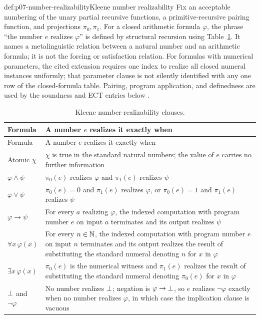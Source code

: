 \begin{hbdefinition}{def:p07-number-realizability}{Kleene number realizability}
Fix an acceptable numbering of the unary partial recursive functions, a
primitive-recursive pairing function, and projections \(\pi_0,\pi_1\).  For
a closed arithmetic formula \(\varphi\), the phrase
``the number \(e\) realizes \(\varphi\)'' is defined by structural recursion using
Table~\ref{tab:p07-number-realizability}.  It names a metalinguistic relation
between a natural number and an arithmetic formula; it is not the forcing or
satisfaction relation.  For formulas with numerical parameters, the cited
extension requires one index to realize all closed numeral instances
uniformly; that parameter clause is not silently identified with any one row
of the closed-formula table.  Pairing, program application, and definedness
are used by the soundness and ECT entries below \cite{Troelstra1998}.
\end{hbdefinition}

\begingroup\small
\begin{longtable}{@{}p{}p{}@{}}
\caption{Kleene number-realizability clauses.}
\label{tab:p07-number-realizability}\\
\toprule
Formula & A number \(e\) realizes it exactly when \\
\midrule
\endfirsthead
\toprule
Formula & A number \(e\) realizes it exactly when \\
\midrule
\endhead
Atomic \(\chi\) & \(\chi\) is true in the standard natural numbers; the value of
\(e\) carries no further information \\
\(\varphi\land\psi\) & \(\pi_0(e)\) realizes \(\varphi\) and
\(\pi_1(e)\) realizes \(\psi\) \\
\(\varphi\lor\psi\) & \(\pi_0(e)=0\) and \(\pi_1(e)\) realizes \(\varphi\), or
\(\pi_0(e)=1\) and \(\pi_1(e)\) realizes \(\psi\) \\
\(\varphi\to\psi\) & For every \(a\) realizing \(\varphi\), the indexed
computation with program number \(e\) on input \(a\) terminates and its output
realizes \(\psi\) \\
\(\forall x\,\varphi(x)\) & For every \(n\in\mathbb{N}\), the indexed computation
with program number \(e\) on input \(n\) terminates and its output realizes the
result of substituting the standard numeral denoting \(n\) for \(x\) in
\(\varphi\) \\
\(\exists x\,\varphi(x)\) & \(\pi_0(e)\) is the numerical witness and
\(\pi_1(e)\) realizes the result of substituting the standard numeral denoting
\(\pi_0(e)\) for \(x\) in \(\varphi\) \\
\(\bot\) and \(\neg\varphi\) & No number realizes \(\bot\); negation is
\(\varphi\to\bot\), so \(e\) realizes \(\neg\varphi\) exactly when no
number realizes \(\varphi\), in which case the implication clause is vacuous \\
\bottomrule
\end{longtable}
\endgroup


